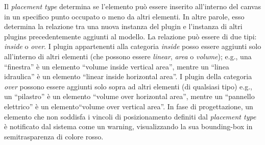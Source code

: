 Il \emph{placement type} determina se l'elemento può essere inserito all'interno del canvas in un specifico punto occupato o meno
da altri elementi. In altre parole, esso determina la relazione tra una nuova instanza del plugin e l'instanza di altri
plugins precedentemente aggiunti al modello. La relazione può essere di due tipi: \emph{inside} o \emph{over}.
I plugin appartenenti alla categoria \emph{inside} posso essere aggiunti solo all'interno di altri elementi (che possono essere
\emph{linear}, \emph{area} o \emph{volume}); e.g., una ``finestra'' è un elemento ``volume inside vertical area'',
mentre un ``linea idraulica'' \`e un elemento ``linear inside horizontal area''.
I plugin della categoria \emph{over} possono essere aggiunti solo sopra ad altri elementi (di qualsiasi tipo)
e.g., un ``pilastro'' \`e un elemento ``volume over horizontal area'',
mentre un ``pannello elettrico'' è un elemento``volume over vertical area''.
In fase di progettazione, un elemento che non soddisfa i vincoli di posizionamento definiti dal \emph{placement type} \`e
notificato dal sistema come un warning, visualizzando la sua bounding-box in semitrasparenza di colore rosso.
\newpage
